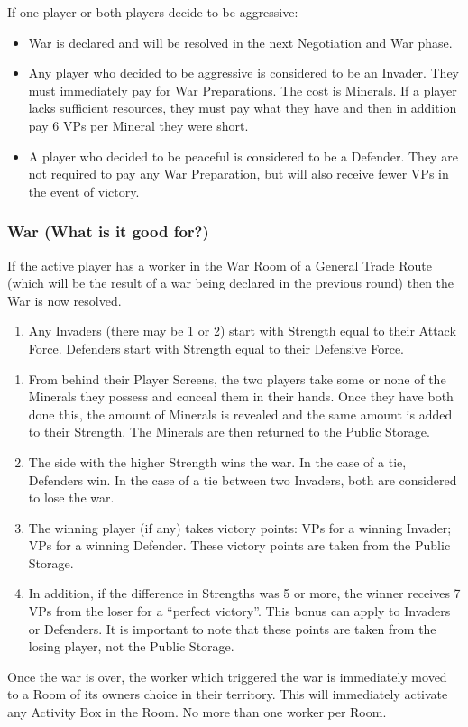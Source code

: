 \documentclass[10pt,twocolumn]{article}
\begin{document}
{\noindent If one player or both players decide to be aggressive:}
\begin{itemize}
\item War is declared and will be resolved in the next Negotiation and War phase.
\item Any player who decided to be aggressive is considered to be an Invader. They must immediately pay for War Preparations. The cost is  Minerals. If a player lacks sufficient resources, they must pay what they have and then in addition pay 6 VPs per Mineral they were short.
\item A player who decided to be peaceful is considered to be a Defender. They are not required to pay any War Preparation, but will also receive fewer VPs in the event of victory.
\end{itemize}

\subsubsection{War (What is it good for?)}
If the active player has a worker in the War Room of a General Trade Route (which will be the result of a war being declared in the previous round) then the War is now resolved.
\begin{enumerate}
\item Any Invaders (there may be 1 or 2) start with Strength equal to their Attack Force. Defenders start with Strength equal to their Defensive Force.
\end{enumerate}
\begin{enumerate}[resume]
\item From behind their Player Screens, the two players take some or none of the Minerals they possess and conceal them in their hands. Once they have both done this, the amount of Minerals is revealed and the same amount is added to their Strength. The Minerals are then returned to the Public Storage.
\item The side with the higher Strength wins the war. In the case of a tie, Defenders win. In the case of a tie between two Invaders, both are considered to lose the war.
\item The winning player (if any) takes victory points:  VPs for a winning Invader;  VPs for a winning Defender. These victory points are taken from the Public Storage.
\item In addition, if the difference in Strengths was 5 or more, the winner receives 7 VPs from the loser for a ``perfect victory''. This bonus can apply to Invaders or Defenders. It is important to note that these points are taken from the losing player, not the Public Storage.
\end{enumerate}
Once the war is over, the worker which triggered the war is immediately moved to a Room of its owners choice in their territory. This will immediately activate any Activity Box in the Room. No more than one worker per Room.
\end{document}
